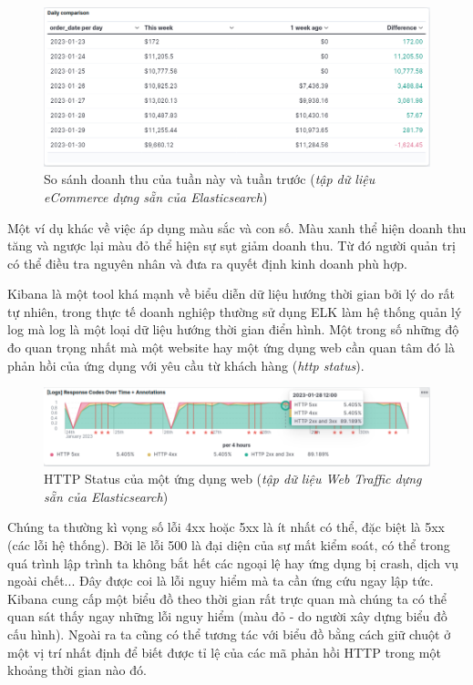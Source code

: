 \begin{figure}[H] %
    \centering %
    \includegraphics[width=1\textwidth]{figures/daily_compare.png} 
    \caption{So sánh doanh thu của tuần này và tuần trước (\textit{tập dữ liệu eCommerce dựng sẵn của Elasticsearch})} %
    \label{fig:elk_01}
\end{figure}

Một ví dụ khác về việc áp dụng màu sắc và con số. Màu xanh thể hiện doanh thu tăng và ngược lại màu đỏ thể hiện sự sụt giảm doanh thu. Từ đó người quản trị có thể điều tra nguyên nhân và đưa ra quyết định kinh doanh phù hợp.

Kibana là một tool khá mạnh về biểu diễn dữ liệu hướng thời gian bởi lý do rất tự nhiên, trong thực tế doanh nghiệp thường sử dụng ELK làm hệ thống quản lý log mà log là một loại dữ liệu hướng thời gian điển hình. Một trong số những độ đo quan trọng nhất mà một website hay một ứng dụng web cần quan tâm đó là phản hồi của ứng dụng với yêu cầu từ khách hàng (\textit{http status}). 

\begin{figure}[H] %
    \centering %
    \includegraphics[width=1\textwidth]{figures/req_http_stt.png} 
    \caption{ HTTP Status của một ứng dụng web (\textit{tập dữ liệu Web Traffic dựng sẵn của Elasticsearch})} %
    \label{fig:elk_01}
\end{figure}

Chúng ta thường kì vọng số lỗi 4xx hoặc 5xx là ít nhất có thể, đặc biệt là 5xx (các lỗi hệ thống). Bởi lẽ lỗi 500 là đại diện của sự mất kiểm soát, có thể trong quá trình lập trình ta không bắt hết các ngoại lệ hay ứng dụng bị crash, dịch vụ ngoài chết... Đây được coi là lỗi nguy hiểm mà ta cần ứng cứu ngay lập tức. Kibana cung cấp một biểu đồ theo thời gian rất trực quan mà chúng ta có thể quan sát thấy ngay những lỗi nguy hiểm (màu đỏ - do người xây dựng biểu đồ cấu hình). Ngoài ra ta cũng có thể tương tác với biểu đồ bằng cách giữ chuột ở một vị trí nhất định để biết được tỉ lệ của các mã phản hồi HTTP trong một khoảng thời gian nào đó. 

